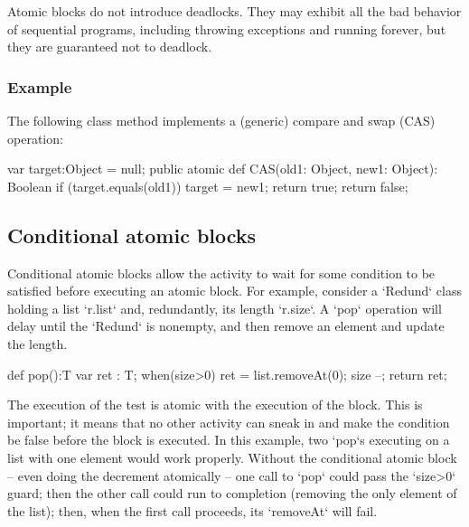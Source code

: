 Atomic blocks do not introduce deadlocks.    They may exhibit all the bad
behavior of sequential programs, including throwing exceptions and running
forever, but they are guaranteed not to deadlock.


\subsubsection{Example}

The following class method implements a (generic) compare and swap (CAS) operation:


\begin{xten}
var target:Object = null;
public atomic def CAS(old1: Object, new1: Object): Boolean {
   if (target.equals(old1)) {
     target = new1;
     return true;
   }
   return false;
}
\end{xten}

\subsection{Conditional atomic blocks}



Conditional atomic blocks allow the activity to wait for some condition to be
satisfied before executing an atomic block. For example, consider a
\xcd`Redund` class holding a list \xcd`r.list` and, redundantly, its length
\xcd`r.size`.  A \xcd`pop` operation will delay until the \xcd`Redund` is
nonempty, and then remove an element and update the length.  
\begin{xten}
def pop():T {
  var ret : T;
  when(size>0) {
    ret = list.removeAt(0);
    size --;
    }
  return ret;
}
\end{xten}


The execution of the test is atomic with the execution of the block.  This is
important; it means that no other activity can sneak in and make the condition
be false before the block is executed.  In this example, two \xcd`pop`s
executing on a list with one element would work properly. Without the
conditional atomic block -- even doing the decrement atomically -- one call to
\xcd`pop` could pass the \xcd`size>0` guard; then the other call could run to
completion (removing the only element of the list); then, when the first call
proceeds, its \xcd`removeAt` will fail.  

